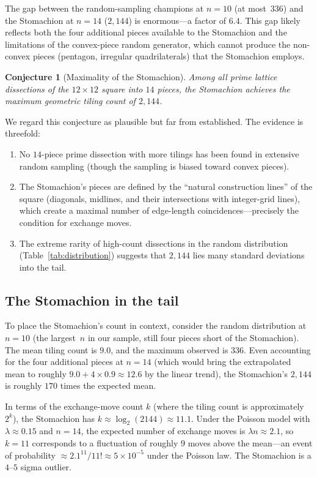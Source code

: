 \documentclass[12pt]{article}
\newtheorem{conjecture}[theorem]{Conjecture}
\theoremstyle{definition}
\theoremstyle{remark}
\begin{document}
The gap between the random-sampling champions at $n = 10$ (at most~$336$)
and the Stomachion at $n = 14$ ($2{,}144$) is enormous---a factor of
$6.4$. This gap likely reflects both the four additional pieces available
to the Stomachion and the limitations of the convex-piece random
generator, which cannot produce the non-convex pieces (pentagon,
irregular quadrilaterals) that the Stomachion employs.

\begin{conjecture}[Maximality of the Stomachion]
\label{conj:maximal}
Among all prime lattice dissections of the $12 \times 12$ square into
$14$ pieces, the Stomachion achieves the maximum geometric tiling count
of $2{,}144$.
\end{conjecture}

We regard this conjecture as plausible but far from established. The
evidence is threefold:
\begin{enumerate}[label=(\alph*)]
\item No $14$-piece prime dissection with more tilings has been found
  in extensive random sampling (though the sampling is biased toward
  convex pieces).
\item The Stomachion's pieces are defined by the ``natural construction
  lines'' of the square (diagonals, midlines, and their intersections
  with integer-grid lines), which create a maximal number of
  edge-length coincidences---precisely the condition for exchange moves.
\item The extreme rarity of high-count dissections in the random
  distribution (Table~\ref{tab:distribution}) suggests that $2{,}144$
  lies many standard deviations into the tail.
\end{enumerate}

\subsection{The Stomachion in the tail}
\label{sec:tail}

To place the Stomachion's count in context, consider the random
distribution at $n = 10$ (the largest~$n$ in our sample, still four
pieces short of the Stomachion). The mean tiling count is $9.0$, and
the maximum observed is $336$. Even accounting for the four additional
pieces at $n = 14$ (which would bring the extrapolated mean to roughly
$9.0 + 4 \times 0.9 \approx 12.6$ by the linear trend), the
Stomachion's $2{,}144$ is roughly $170$ times the expected mean.

In terms of the exchange-move count $k$ (where the tiling count is
approximately $2^k$), the Stomachion has $k \approx \log_2(2144) \approx
11.1$. Under the Poisson model with $\lambda \approx 0.15$ and
$n = 14$, the expected number of exchange moves is
$\lambda n \approx 2.1$, so $k = 11$ corresponds to a
fluctuation of roughly $9$ moves above the mean---an event of
probability $\approx 2.1^{11}/11! \approx 5 \times 10^{-5}$ under
the Poisson law. The Stomachion is a $4$--$5$ sigma outlier.
\end{document}

